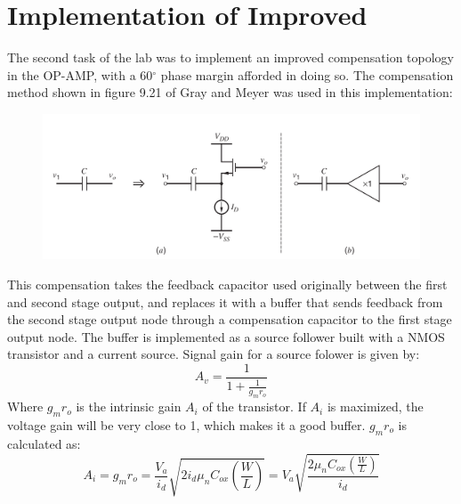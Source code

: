 \documentclass[12pt]{article}
\begin{document}
\section{Implementation of Improved}
The second task of the lab was to implement an improved compensation topology in the OP-AMP, with a 60$ ^\circ$ phase margin afforded in doing so. The compensation method shown in figure 9.21 of Gray and Meyer was used in this implementation:
\FloatBarrier
\begin{figure}[h!]
\begin{center}
 \includegraphics[scale=0.2]{./comp.png}
\end{center}
\end{figure}
\FloatBarrier
This compensation takes the feedback capacitor used originally between the first and second stage output, and replaces it with a buffer that sends feedback from the second stage output node through a compensation capacitor to the first stage output node. The buffer is implemented as a source follower built with a NMOS transistor and a current source. Signal gain for a source folower is given by:
\begin{equation}
A_v = \frac{1}{1+\frac{1}{g_m r_o}}
\end{equation}
Where $g_m r_o$ is the intrinsic gain $A_i$ of the transistor. If $A_i$ is maximized, the voltage gain will be very close to 1, which makes it a good buffer. $g_m r_o$ is calculated as:
\begin{equation}
A_i = g_m r_o = \frac{V_a}{i_d}\sqrt{2 i_d \mu_n C_{ox}\left(\frac{W}{L}\right)} = V_a \sqrt{\frac{2 \mu_n C_{ox}\left(\frac{W}{L}\right)}{i_d}}
\end{equation}
\end{document}

